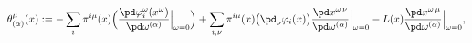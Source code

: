 \begin{equation}	\label{2.9}
\theta_{(\alpha)}^{\mu}(x)
:=
- \sum_{i} \pi^{i\mu}(x)
\Bigl(
\frac{\pd\varphi_i^\omega(x^\omega)} {\pd\omega^{(\alpha)}} \Big|_{\omega=0}
\Bigr)
+
\sum_{i,\nu}\pi^{i\mu}(x)
\bigl( \pd_\nu\varphi_i(x) \bigr)
\frac{\pd x^{\omega\,\nu}} {\pd\omega^{(\alpha)}} \Big|_{\omega=0}
-
L(x) \frac{\pd x^{\omega\,\mu}} {\pd\omega^{(\alpha)}} \Big|_{\omega=0} ,
	\end{equation}


